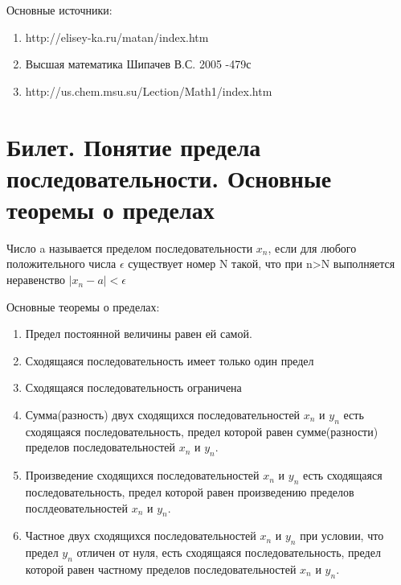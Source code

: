 \documentclass[12pt]{article}
\begin{document}
	Основные источники: \begin{enumerate}
	\item http://elisey-ka.ru/matan/index.htm
	\item Высшая математика Шипачев В.С. 2005 -479с 
	\item http://us.chem.msu.su/Lection/Math1/index.htm
	\end{enumerate}
	\section{Билет. Понятие предела последовательности. Основные теоремы о пределах}
	
	Число a называется пределом последовательности ${x_n}$, если для любого положительного числа $\epsilon$ существует номер N такой, что при n>N выполняется неравенство $|x_n-a|<\epsilon$ 
	
	Основные теоремы о пределах: 
	
	
	\begin{enumerate}
	    \item Предел постоянной величины равен ей самой.
		\item Сходящаяся последовательность имеет только один предел
		\item Сходящаяся последовательность ограничена
		\item Сумма(разность) двух сходящихся последовательностей ${x_n}$ и ${y_n}$ есть сходящаяся последовательность, предел которой равен сумме(разности) пределов последовательностей ${x_n}$ и ${y_n}$.
		\item Произведение сходящихся последовательностей ${x_n}$ и ${y_n}$ есть сходящаяся последовательность, предел которой равен произведению пределов послдеовательностей ${x_n}$ и ${y_n}$.
		\item Частное двух сходящихся последовательностей ${x_n}$ и ${y_n}$ при условии, что предел ${y_n}$ отличен от нуля, есть сходящаяся последовательность, предел которой равен частному пределов последовательностей ${x_n}$ и ${y_n}$.
		
	\end{enumerate}
\end{document}
